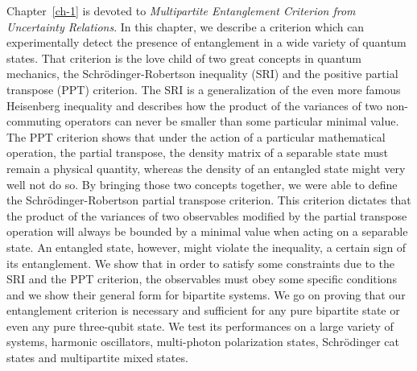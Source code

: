 Chapter~\ref{ch-1} is devoted to \textit{Multipartite Entanglement Criterion from Uncertainty Relations}. In this chapter, we describe a criterion which can experimentally detect the presence of entanglement in a wide variety of quantum states. That criterion is the love child of two great concepts in quantum mechanics, the Schr\"odinger-Robertson inequality (SRI) and the positive partial transpose (PPT) criterion. The SRI is a generalization of the even more famous Heisenberg inequality and describes how the product of the variances of two non-commuting operators can never be smaller than some particular minimal value. The PPT criterion shows that under the action of a particular mathematical operation, the partial transpose, the density matrix of a separable state must remain a physical quantity, whereas the density of an entangled state might very well not do so. By bringing those two concepts together, we were able to define the Schr\"odinger-Robertson partial transpose criterion. This criterion dictates that the product of the variances of two observables modified by the partial transpose operation will always be bounded by a minimal value when acting on a separable state. An entangled state, however, might violate the inequality, a certain sign of its entanglement. We show that in order to satisfy some constraints due to the SRI and the PPT criterion, the observables must obey some specific conditions and we show their general form for bipartite systems. We go on proving that our entanglement criterion is necessary and sufficient for any pure bipartite state or even any pure three-qubit state. We test its performances on a large variety of systems, harmonic oscillators, multi-photon polarization states, Schr\"odinger cat states and multipartite mixed states.

